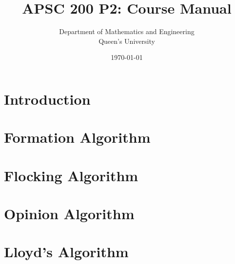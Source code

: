 \documentclass{article}
\title{APSC 200 P2: Course Manual}
\author{Department of Mathematics and Engineering\\
        Queen's University}
\date{\today}
\begin{document}
\maketitle
\newpage
\tableofcontents
\newpage

\section{Introduction} \label{Introduction}


\section{Formation Algorithm} \label{Formation Algorithm}


\section{Flocking Algorithm} \label{Flocking Algorithm}


\section{Opinion Algorithm} \label{Opinion Algorithm}


\section{Lloyd's Algorithm} \label{Lloyd's Algorithm}

\end{document}

